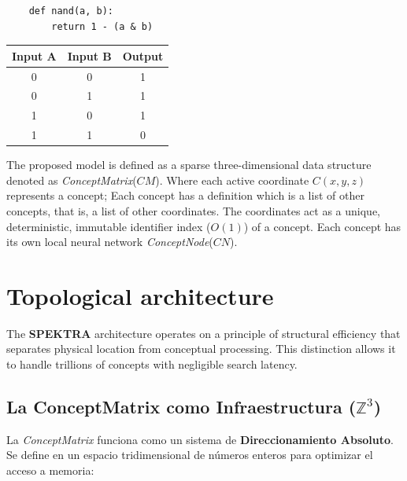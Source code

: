 \documentclass[12pt]{article}
\begin{document}
\begin{tcolorbox}[
	title=python, 
	label=def:python,
	coltitle=black,
	colback=gray!10,    
	colframe=gray!50,   
	height=3cm,          
	width=\textwidth,   
	sharp corners     
	]


\begin{lstlisting}
	def nand(a, b):
		return 1 - (a & b)
\end{lstlisting}


	\vfill 
\end{tcolorbox}



\begin{center}
	\begin{tabular}{|c|c|c|} 
		\hline
		\textbf{Input A} & \textbf{Input B} & \textbf{Output} \\ \hline
		0 & 0 & 1 \\ \hline
		0 & 1 & 1 \\ \hline
		1 & 0 & 1 \\ \hline
		1 & 1 & 0 \\ \hline
	\end{tabular}
\end{center}





The proposed model is defined as a sparse three-dimensional data structure denoted as \textit{ConceptMatrix}($CM$). Where each active coordinate $C(x, y, z)$ represents a concept; 
Each concept has a definition which is a list of other concepts, that is, a list of other coordinates.
The coordinates act as a unique, deterministic, immutable identifier index ($O(1)$) of a concept.
Each concept has its own local neural network \textit{ConceptNode}($CN$). 


\section{Topological architecture}

The \textbf{SPEKTRA} architecture operates on a principle of structural efficiency that separates physical location from conceptual processing. This distinction allows it to handle trillions of concepts with negligible search latency.

\subsection{La ConceptMatrix como Infraestructura ($\mathbb{Z}^3$)}
La \textit{ConceptMatrix} funciona como un sistema de \textbf{Direccionamiento Absoluto}. Se define en un espacio tridimensional de números enteros para optimizar el acceso a memoria:
\end{document}
